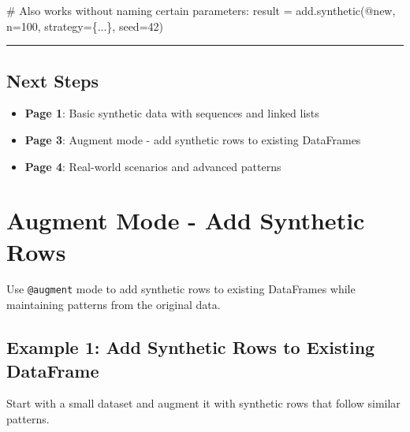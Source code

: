 \documentclass[
  letterpaper,
]{scrbook}
\newenvironment{Shaded}{\begin{snugshade}}{\end{snugshade}}
\newcommand{\CommentTok}[1]{\textcolor[rgb]{0.37,0.37,0.37}{#1}}
\newcommand{\DecValTok}[1]{\textcolor[rgb]{0.68,0.00,0.00}{#1}}
\newcommand{\NormalTok}[1]{\textcolor[rgb]{0.00,0.23,0.31}{#1}}
\newcommand{\OperatorTok}[1]{\textcolor[rgb]{0.37,0.37,0.37}{#1}}
\newcommand{\StringTok}[1]{\textcolor[rgb]{0.13,0.47,0.30}{#1}}
\providecommand{\tightlist}{%
  \setlength{\itemsep}{0pt}\setlength{\parskip}{0pt}}
\begin{document}
\begin{Shaded}
\begin{Highlighting}[]
\CommentTok{\# Also works without naming certain parameters:}
\NormalTok{result }\OperatorTok{=}\NormalTok{ add.synthetic(}\StringTok{\textquotesingle{}@new\textquotesingle{}}\NormalTok{, n}\OperatorTok{=}\DecValTok{100}\NormalTok{, strategy}\OperatorTok{=}\NormalTok{\{...\}, seed}\OperatorTok{=}\DecValTok{42}\NormalTok{)}
\end{Highlighting}
\end{Shaded}

\begin{center}\rule{0.5\linewidth}{0.5pt}\end{center}

\section{Next Steps}\label{next-steps-13}

\begin{itemize}
\tightlist
\item
  \textbf{Page 1}: Basic synthetic data with sequences and linked lists
\item
  \textbf{Page 3}: Augment mode - add synthetic rows to existing
  DataFrames
\item
  \textbf{Page 4}: Real-world scenarios and advanced patterns
\end{itemize}

\chapter{Augment Mode - Add Synthetic
Rows}\label{augment-mode---add-synthetic-rows}

Use \texttt{@augment} mode to add synthetic rows to existing DataFrames
while maintaining patterns from the original data.

\section{Example 1: Add Synthetic Rows to Existing
DataFrame}\label{example-1-add-synthetic-rows-to-existing-dataframe}

Start with a small dataset and augment it with synthetic rows that
follow similar patterns.
\end{document}
